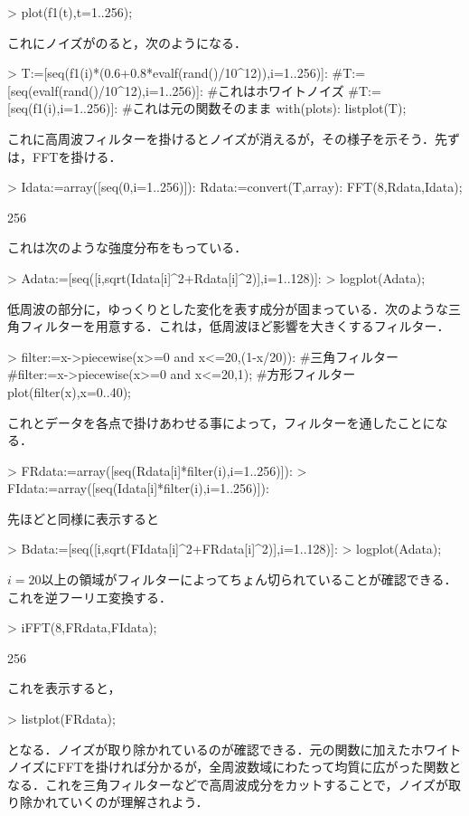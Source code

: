 \begin{MapleInput}
> plot(f1(t),t=1..256);
\end{MapleInput}

これにノイズがのると，次のようになる．
\begin{MapleInput}
> T:=[seq(f1(i)*(0.6+0.8*evalf(rand()/10^12)),i=1..256)]:
  #T:=[seq(evalf(rand()/10^12),i=1..256)]:  #これはホワイトノイズ
  #T:=[seq(f1(i),i=1..256)]: #これは元の関数そのまま
  with(plots):
  listplot(T);
\end{MapleInput}
これに高周波フィルターを掛けるとノイズが消えるが，その様子を示そう．先ずは，FFTを掛ける．
\begin{MapleInput}
> Idata:=array([seq(0,i=1..256)]):
  Rdata:=convert(T,array):
  FFT(8,Rdata,Idata);
\end{MapleInput}
\begin{MapleOutput}
256
\end{MapleOutput}
これは次のような強度分布をもっている．
\begin{MapleInput}
> Adata:=[seq([i,sqrt(Idata[i]^2+Rdata[i]^2)],i=1..128)]:
> logplot(Adata);
\end{MapleInput}
低周波の部分に，ゆっくりとした変化を表す成分が固まっている．次のような三角フィルターを用意する．これは，低周波ほど影響を大きくするフィルター．
\begin{MapleInput}
> filter:=x->piecewise(x>=0 and x<=20,(1-x/20)): #三角フィルター
  #filter:=x->piecewise(x>=0 and x<=20,1); #方形フィルター
  plot(filter(x),x=0..40);
\end{MapleInput}
これとデータを各点で掛けあわせる事によって，フィルターを通したことになる．
\begin{MapleInput}
> FRdata:=array([seq(Rdata[i]*filter(i),i=1..256)]):
> FIdata:=array([seq(Idata[i]*filter(i),i=1..256)]):
\end{MapleInput}
先ほどと同様に表示すると
\begin{MapleInput}
> Bdata:=[seq([i,sqrt(FIdata[i]^2+FRdata[i]^2)],i=1..128)]:
> logplot(Adata);
\end{MapleInput}
$i=20$以上の領域がフィルターによってちょん切られていることが確認できる．これを逆フーリエ変換する．
\begin{MapleInput}
> iFFT(8,FRdata,FIdata);
\end{MapleInput}
\begin{MapleOutput}
256
\end{MapleOutput}
これを表示すると，
\begin{MapleInput}
> listplot(FRdata);
\end{MapleInput}
となる．ノイズが取り除かれているのが確認できる．元の関数に加えたホワイトノイズにFFTを掛ければ分かるが，全周波数域にわたって均質に広がった関数となる．これを三角フィルターなどで高周波成分をカットすることで，ノイズが取り除かれていくのが理解されよう．
